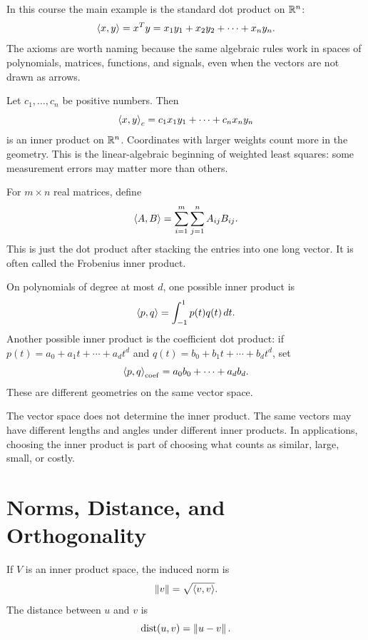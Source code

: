 In this course the main example is the standard dot product on $\mathbb{R}^n$:
\[
  \left\langle x,y \right\rangle
  = x^T y
  = x_1y_1 + x_2y_2 + \cdots + x_ny_n.
\]
The axioms are worth naming because the same algebraic rules work in spaces of
polynomials, matrices, functions, and signals, even when the vectors are not
drawn as arrows.

\begin{example}
Let $c_1,\ldots,c_n$ be positive numbers. Then
\[
  \left\langle x,y \right\rangle_c = c_1x_1y_1+\cdots+c_nx_ny_n
\]
is an inner product on $\mathbb{R}^n$. Coordinates with larger weights count more in
the geometry. This is the linear-algebraic beginning of weighted least squares:
some measurement errors may matter more than others.
\end{example}

\begin{example}
For $m \times n$ real matrices, define
\[
  \left\langle A,B \right\rangle = \sum_{i=1}^m \sum_{j=1}^n A_{ij}B_{ij}.
\]
This is just the dot product after stacking the entries into one long vector.
It is often called the Frobenius inner product.
\end{example}

\begin{example}
On polynomials of degree at most $d$, one possible inner product is
\[
  \left\langle p,q \right\rangle = \int_{-1}^{1} p(t)q(t)\,dt.
\]
Another possible inner product is the coefficient dot product:
if $p(t)=a_0+a_1t+\cdots+a_dt^d$ and
$q(t)=b_0+b_1t+\cdots+b_dt^d$, set
\[
  \left\langle p,q \right\rangle_{\mathrm{coef}} = a_0b_0+\cdots+a_db_d.
\]
These are different geometries on the same vector space.
\end{example}

\begin{warningbox}
The vector space does not determine the inner product. The same vectors may
have different lengths and angles under different inner products. In
applications, choosing the inner product is part of choosing what counts as
similar, large, small, or costly.
\end{warningbox}

\section{Norms, Distance, and Orthogonality}

\begin{definition}
If $V$ is an inner product space, the induced norm is
\[
  \left\lVert v \right\rVert = \sqrt{\left\langle v,v \right\rangle}.
\]
The distance between $u$ and $v$ is
\[
  \operatorname{dist}(u,v)=\left\lVert u-v \right\rVert.
\]
\end{definition}

